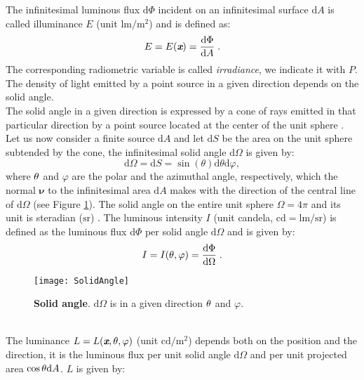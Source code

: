 The infinitesimal luminous flux $\textrm{d}\Phi$ incident on an infinitesimal surface $\textrm{d}A$ is called illuminance $E$ (unit $\textrm{lm}/\textrm{m}^2$)
and is defined as:
\begin{equation}
 E=E(\textit{\textbf{x}}) = \frac{\textrm{d}\Phi}{\textrm{d}A}\;.
 \end{equation}
The corresponding radiometric variable is called \textit{irradiance}, we indicate it with $P$. The density of light emitted by a point source in a given direction depends on the solid angle.\\ \indent
The solid angle in a given direction is expressed by a cone of rays emitted in that particular direction by a point source located at the center of the unit sphere \cite{koshel2012illumination}. Let us now consider a finite source $\textrm{d}A$ and let $\textrm{d}S$ be the area on the unit sphere subtended by the cone,
the infinitesimal solid angle $\textrm{d}\Omega$ is given by:
\begin{equation}\label{solid_angle}
\textrm{d}\Omega = \textrm{d}S= \sin(\theta)\textrm{d}\theta \textrm{d}\varphi,
\end{equation}
 where $\theta$ and $\varphi$ are the polar and the azimuthal angle, respectively, which the normal $\boldsymbol{\nu}$ to the infinitesimal area $\textrm{d}A$ makes with the direction of the central line of $\textrm{d}\Omega$ (see Figure \ref{fig:rad}).
The solid angle on the entire unit sphere $\Omega = 4\pi$ and its unit is steradian ($\textrm{sr}$) \cite{arecchi2007field}.
The luminous intensity $I$ (unit candela, $\textrm{cd}=\textrm{lm}/\textrm{sr}$) is defined as the luminous flux $\textrm{d}\Phi$ per solid angle
$\textrm{d}\Omega$ and is given by:
\begin{equation}\label{intensity}
I = I(\theta, \varphi) = \frac{\textrm{d}\Phi}{\textrm{d}\Omega}\;.
\end{equation}
 \begin{figure}[t]
  \begin{center}
  \texttt{[image: SolidAngle]}
  \end{center}
  \caption{\textbf{Solid angle}. $\textrm{d}\Omega$ is in a given direction $\theta$ and $\varphi$.}
  \label{fig:rad}
  \end{figure}
\\ \indent 
The luminance $L = L(\textit{\textbf{x}}, \theta, \varphi)$ (unit $\textrm{cd} / \textrm{m}^2$) depends both on the position and the direction, it is the luminous flux per unit solid angle $\textrm{d}\Omega$ and  per unit projected area $\cos\theta \textrm{d}A$.  $L$  is given by:
